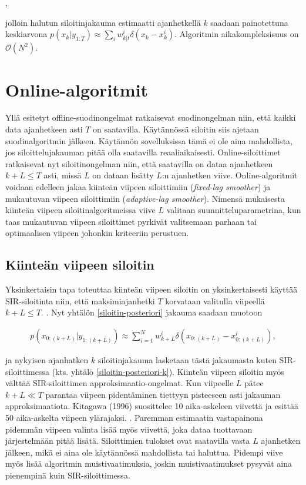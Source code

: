 \documentclass[
  12pt,
  a4paper, twoside]{book}
\begin{document}
,

jolloin halutun siloitinjakauma estimaatti ajanhetkellä \(k\) saadaan painotettuna keskiarvona \(p(x_k|y_{1:T}) \approx \sum_i w_{k|t}^i \delta (x_k-x_k^i)\). Algoritmin aikakompleksisuus on \(\mathcal{O}(N^2)\).

\section{Online-algoritmit}

Yllä esitetyt offline-suodinongelmat ratkaisevat suodinongelman niin, että kaikki data ajanhetkeen asti \(T\) on saatavilla. Käytännössä siloitin siis ajetaan suodinalgoritmin jälkeen. Käytännön sovelluksissa tämä ei ole aina mahdollista, jos siloittelujakauman pitää olla saatavilla reaaliaikaisesti. Online-siloittimet ratkaisevat nyt siloitinongelman niin, että saatavilla on dataa ajanhetkeen \(k+L \le T\) asti, missä \(L\) on dataan lisätty \(L\):n ajanhetken viive. Online-algoritmit voidaan edelleen jakaa kiinteän viipeen siloittimiin (\emph{fixed-lag smoother}) ja mukautuvan viipeen siloittimiin (\emph{adaptive-lag smoother}). Nimensä mukaisesta kiinteän viipeen siloitinalgoritmeissa viive \(L\) valitaan suunnitteluparametrina, kun taas mukautuvan viipeen siloittimet pyrkivät valitsemaan parhaan tai optimaalisen viipeen johonkin kriteeriin perustuen.

\subsection{Kiinteän viipeen siloitin}

Yksinkertaisin tapa toteuttaa kiinteän viipeen siloitin on yksinkertaisesti käyttää SIR-siloitinta niin, että maksimiajanhetki \(T\) korvataan valitulla viipeellä \(k+L \le T\). \citep{kitagawa-1996}. Nyt yhtälön \ref{siloitin-posteriori} jakauma saadaan muotoon

\begin{align}\label{siloitin-posteriori-viive}
p(x_{0:(k+L)}|y_{1:(k+L)}) \approx \sum_{i=1}^N w_{k+L}^i \delta (x_{0:(k+L)}-x_{0:(k+L)}^i),
\end{align}

ja nykyisen ajanhatken \(k\) siloitinjakauma lasketaan tästä jakaumasta kuten SIR-siloittimessa (kts. yhtälö \ref{siloitin-posteriori-k}). Kiinteän viipeen siloitin myös välttää SIR-siloittimen approksimaatio-ongelmat. Kun viipeelle \(L\) pätee \(k+L \ll T\) parantaa viipeen pidentäminen tiettyyn pisteeseen asti jakauman approksimaatiota. Kitagawa (1996) suosittelee 10 aika-askeleen viivettä ja esittää 50 aika-askelta viipeen ylärajaksi. \citep{kitagawa-1996}. Paremman estimaatin vastapainona pidemmän viipeen valinta lisää myös viivettä, joka dataa tuottavaan järjestelmään pitää lisätä. Siloittimien tulokset ovat saatavilla vasta \(L\) ajanhetken jälkeen, mikä ei aina ole käytännössä mahdollista tai haluttua. Pidempi viive myös lisää algoritmin muistivaatimuksia, joskin muistivaatimukset pysyvät aina pienempinä kuin SIR-siloittimessa.
\end{document}
